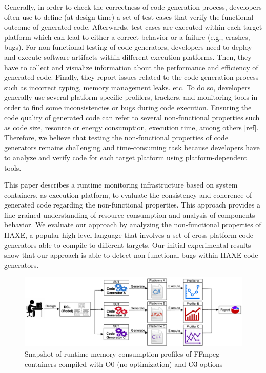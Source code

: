 Generally, in order to check the correctness of code generation process, developers often use to define (at design time) a set of test cases that verify the functional outcome of generated code. Afterwards, test cases are executed within each target platform which can lead to either a correct behavior or a failure (e.g., crashes, bugs). 
For non-functional testing of code generators, developers need to deploy and execute software artifacts within different execution platforms. Then, they have to collect and visualize information about the performance and efficiency of generated code. Finally, they report issues related to the code generation process such as incorrect typing, memory management leaks. etc. To do so, developers generally use several platform-specific profilers, trackers, and monitoring tools in order to find some inconsistencies or bugs during code execution. Ensuring the code quality of generated code can refer to several non-functional properties such as code size, resource or energy consumption, execution time, among others [ref]. Therefore, we believe that testing the non-functional properties of code generators remains challenging and time-consuming task because developers have to analyze and verify code for each target platform using platform-dependent tools.

This paper describes a runtime monitoring infrastructure based on system containers, as execution platform, to evaluate the consistency and coherence of generated code regarding the non-functional properties. This approach provides a fine-grained understanding of resource consumption and analysis of components behavior. 
We evaluate our approach by analyzing the non-functional properties of HAXE, a popular high-level language that involves a set of cross-platform code generators able to compile to different targets. Our initial experimental results show that our approach is able to detect non-functional bugs within HAXE code generators.

\begin{figure}[h]
	\includegraphics[width=0.85\linewidth]{Ressources/background.pdf}
	\caption{Snapshot of runtime memory consumption profiles of FFmpeg containers compiled with O0 (no optimization) and O3 options}
\end{figure}

